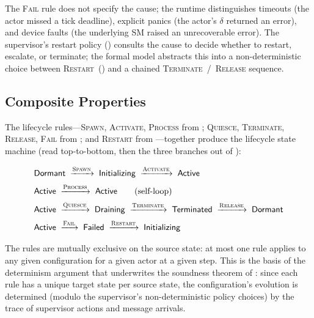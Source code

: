 The \textsc{Fail} rule does not specify the cause; the runtime
distinguishes timeouts (the actor missed a tick deadline),
explicit panics (the actor's \(\delta\) returned an error), and
device faults (the underlying SM raised an unrecoverable error).
The supervisor's restart policy
() consults the cause to decide
whether to restart, escalate, or terminate; the formal model
abstracts this into a non-deterministic choice between
\textsc{Restart}~() and a chained
\textsc{Terminate}~/~\textsc{Release} sequence.

\subsection{Composite Properties}
\label{app:composite-properties}

The lifecycle rules---\textsc{Spawn}, \textsc{Activate},
\textsc{Process} from ;
\textsc{Quiesce}, \textsc{Terminate}, \textsc{Release},
\textsc{Fail} from ; and
\textsc{Restart} from ---together produce the
lifecycle state machine (read top-to-bottom, then the three
branches out of \Active{}):

\[
\begin{aligned}
&\mathsf{Dormant}{} \;\xrightarrow{\textsc{Spawn}}\;
  \mathsf{Initializing}{} \;\xrightarrow{\textsc{Activate}}\;
  \mathsf{Active}{} \\[2pt]
&\mathsf{Active}{} \;\xrightarrow{\textsc{Process}}\; \mathsf{Active}{}
  \qquad\text{(self-loop)} \\[2pt]
&\mathsf{Active}{} \;\xrightarrow{\textsc{Quiesce}}\;
  \mathsf{Draining}{} \;\xrightarrow{\textsc{Terminate}}\;
  \mathsf{Terminated}{} \;\xrightarrow{\textsc{Release}}\;
  \mathsf{Dormant}{} \\[2pt]
&\mathsf{Active}{} \;\xrightarrow{\textsc{Fail}}\;
  \mathsf{Failed}{} \;\xrightarrow{\textsc{Restart}}\;
  \mathsf{Initializing}{}
\end{aligned}
\]

The rules are mutually exclusive on the source state: at most one
rule applies to any given configuration for a given actor at a
given step.  This is the basis of the determinism argument that
underwrites the soundness theorem of :
since each rule has a unique target state per source state, the
configuration's evolution is determined (modulo the supervisor's
non-deterministic policy choices) by the trace of supervisor
actions and message arrivals.
